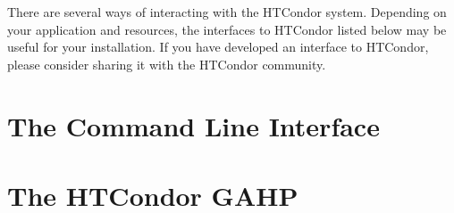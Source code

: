 There are several ways of interacting with the HTCondor system.  Depending on
your application and resources, the interfaces to HTCondor listed below may be
useful for your installation. If you have developed an interface to HTCondor,
please consider sharing it with the HTCondor community.






\section{\label{API-commandline} The Command Line Interface}
\Todo

\section{\label{API-GAHP} The HTCondor GAHP}
\Todo




